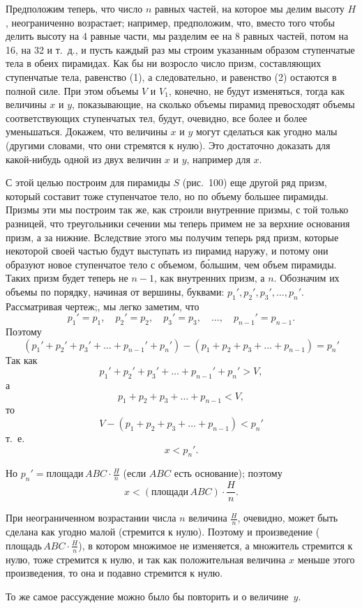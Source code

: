 \documentclass[twoside]{book}
\begin{document}
Предположим теперь, что число $n$ равных частей, на которое мы делим высоту $H$, неограниченно возрастает;
например, предположим, что, вместо того чтобы делить высоту на 4 равные части, мы разделим ее на 8 равных частей, потом на 16, на 32 и т.~д., и пусть каждый раз мы строим указанным образом ступенчатые тела в обеих пирамидах.
Как бы ни возросло число призм, составляющих ступенчатые тела, равенство (1), а следовательно, и равенство (2) остаются в полной силе.
При этом объемы $V$ и $V_1$, конечно, не будут изменяться, тогда как величины $x$ и $y$, показывающие, на сколько объемы пирамид превосходят объемы соответствующих ступенчатых тел, будут, очевидно, все более и более уменьшаться.
Докажем, что величины $x$ и $y$ могут сделаться как угодно малы (другими словами, что они стремятся к нулю).
Это достаточно доказать для какой-нибудь одной из двух величин $x$ и $y$, например для $x$.

С этой целью построим для пирамиды $S$ (рис.~100) еще другой ряд призм, который составит тоже ступенчатое тело, но по объему большее пирамиды.
Призмы эти мы построим так же, как строили внутренние призмы, с той только разницей, что треугольники сечении мы теперь примем не за верхние основания призм, а за нижние.
Вследствие этого мы получим теперь ряд призм, которые некоторой своей частью будут выступать из пирамид наружу, и потому они образуют новое ступенчатое тело с объемом, б\'{о}льшим, чем объем пирамиды.
Таких призм будет теперь не $n-1$, как внутренних призм, а $n$.
Обозначим их объемы по порядку, начиная от вершины, буквами: $p_1',p_2',p_3',\dots,p_n'$.
Рассматривая чертеж;, мы легко заметим, что
\[p_1'=p_1,\quad p_2'=p_2,\quad p_3'=p_3,\quad\dots, \quad p_{n-1}'=p_{n-1}.\]
Поэтому
\[(p_1'+p_2'+p_3'+\dots+p_{n-1}'+p_n')-(p_1+p_2+p_3+\dots+p_{n-1})=p_n'\]
Так как
\[p_1'+p_2'+p_3'+\dots+p_{n-1}'+p_n'>V,\]
а
\[p_1+p_2+p_3+\dots+p_{n-1}<V,\]
то
\[V-(p_1+p_2+p_3+\dots+p_{n-1})<p_n'\]
т.~е.
\[x<p_n'.\]

Но $p_n'=\text{площади}\, ABC\cdot \frac Hn$ 
(если $ABC$ есть основание); поэтому
\[x<(\text{площади}\, ABC)\cdot \frac Hn.\]

При неограниченном возрастании числа $n$ величина $\frac Hn$, очевидно, может быть сделана как угодно малой (стремится к нулю).
Поэтому и произведение ($\text{площадь}\, ABC\cdot \frac Hn$), в котором множимое не изменяется, а множитель стремится к нулю, тоже стремится к нулю, и так как положительная величина $x$ меньше этого произведения, то она и подавно стремится к нулю.

То же самое рассуждение можно было бы повторить и о величине~$y$.
\end{document}
